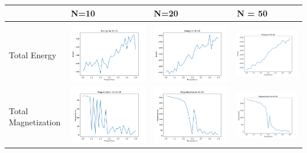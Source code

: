 \documentclass[10pt]{article} %
\begin{document}
\begin{tabular}{p{2cm} | >{\centering\arraybackslash}m{5cm} >{\centering\arraybackslash}m{5cm} >{\centering\arraybackslash}m{5cm}}
	& N=10 & N=20 & N = 50 \\
\hline & & & \\
Total Energy & \includegraphics[width=.3\textwidth]{../figs/q3_N10_EL.pdf} & \includegraphics[width=.3\textwidth]{../figs/q3_N20_EL.pdf} & \includegraphics[width=.3\textwidth]{../figs/q3_N50_EL.pdf} \\
Total Magnetization & \includegraphics[width=.3\textwidth]{../figs/q3_N10_ML.pdf} & \includegraphics[width=.3\textwidth]{../figs/q3_N20_ML.pdf} & \includegraphics[width=.3\textwidth]{../figs/q3_N50_ML.pdf} \\

\end{tabular}
\end{document}
